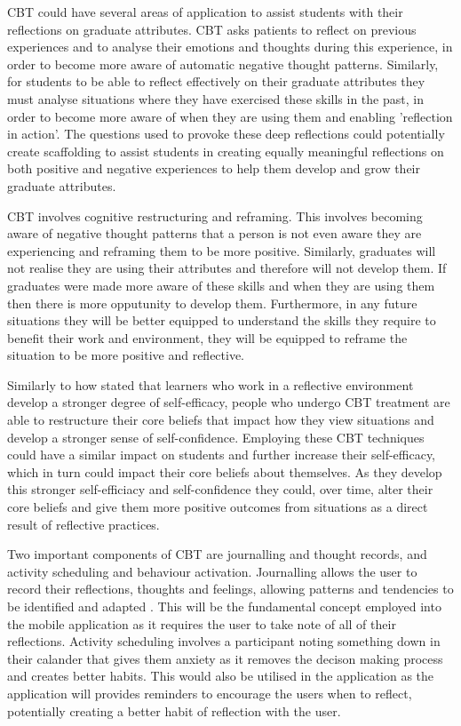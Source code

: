 \documentclass{l4proj}
\begin{document}
CBT could have several areas of application to assist students with their reflections on graduate attributes. CBT asks patients to reflect on previous
experiences and to analyse their emotions and thoughts during this experience, in order to become more aware of automatic negative thought patterns. Similarly, 
for students to be able to reflect effectively on their graduate attributes they must analyse situations where they have exercised these skills in the past,
in order to become more aware of when they are using them and enabling 'reflection in action'. The questions used to provoke these deep reflections could 
potentially create scaffolding to 
assist students in creating equally meaningful reflections on both positive and negative experiences to help them develop and grow their graduate attributes.

CBT involves cognitive restructuring and reframing. This involves becoming aware of negative thought patterns that a person is not even aware they are
experiencing and reframing them to be more positive. Similarly, graduates will not realise they are using their attributes and therefore will not develop 
them. If graduates were made more aware of these skills and when they are using them then there is more opputunity to develop them. Furthermore, in 
any future situations they will be better equipped to understand the skills they require to benefit their work and environment, they will be equipped to 
reframe the situation to be more positive and reflective.

Similarly to how \citet{bruno_reflective_2018} stated that learners who work in a reflective environment develop a stronger degree of self-efficacy, people 
who undergo CBT treatment are able to restructure their core beliefs that impact how they view situations and develop a stronger sense of self-confidence. 
Employing these CBT techniques could have a similar impact on students and further increase their self-efficacy, which in turn could impact their core beliefs 
about themselves. As they develop this stronger self-efficiacy and self-confidence they could, over time, alter their core beliefs and give them more 
positive outcomes from situations as a direct result of reflective practices.

Two important components of CBT are journalling and thought records, and activity scheduling and behaviour activation. Journalling allows the user to record 
their reflections, thoughts and feelings, allowing patterns and tendencies to be identified and adapted \citep{ackerman_cbt_2017}. This will be the fundamental
concept employed into the mobile application as it requires the user to take note of all of their reflections. Activity scheduling involves a participant 
noting something down in their calander that gives them anxiety as it removes the decison making process and creates better habits. This would also be utilised in
the application as the application will provides reminders to encourage the users when to reflect, potentially creating a better habit of reflection with the 
user.
\end{document}
